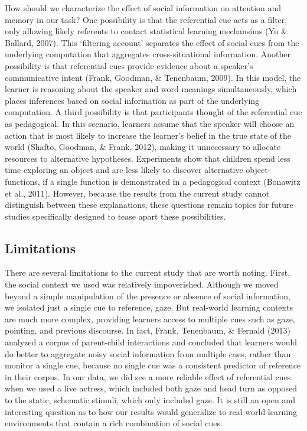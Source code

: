 \documentclass[authoryear, review]{elsarticle}
\begin{document}
How should we characterize the effect of social information on attention
and memory in our task? One possibility is that the referential cue acts
as a filter, only allowing likely referents to contact statistical
learning mechansims (Yu \& Ballard, 2007). This `filtering account'
separates the effect of social cues from the underlying computation that
aggregates cross-situational information. Another possibility is that
referential cues provide evidence about a speaker's communicative intent
(Frank, Goodman, \& Tenenbaum, 2009). In this model, the learner is
reasoning about the speaker and word meanings simultaneously, which
places inferences based on social information as part of the underlying
computation. A third possibility is that participants thought of the
referential cue as pedagogical. In this scenario, learners assume that
the speaker will choose an action that is most likely to increase the
learner's belief in the true state of the world (Shafto, Goodman, \&
Frank, 2012), making it unnecessary to allocate resources to alternative
hypotheses. Experiments show that children spend less time exploring an
object and are less likely to discover alternative object-functions, if
a single function is demonstrated in a pedagogical context (Bonawitz et
al., 2011). However, because the results from the current study cannot
distinguish between these explanations, these questions remain topics
for future studies specifically designed to tease apart these
possibilities.

\subsection{Limitations}\label{limitations}

There are several limitations to the current study that are worth
noting. First, the social context we used was relatively impoverished.
Although we moved beyond a simple manipulation of the presence or
absence of social information, we isolated just a single cue to
reference, gaze. But real-world learning contexts are much more complex,
providing learners access to multiple cues such as gaze, pointing, and
previous discourse. In fact, Frank, Tenenbaum, \& Fernald (2013)
analyzed a corpus of parent-child interactions and concluded that
learners would do better to aggregate noisy social information from
multiple cues, rather than monitor a single cue, because no single cue
was a consistent predictor of reference in their corpus. In our data, we
did see a more reliable effect of referential cues when we used a live
actress, which included both gaze and head turn as opposed to the
static, schematic stimuli, which only included gaze. It is still an open
and interesting question as to how our results would generalize to
real-world learning environments that contain a rich combination of
social cues.
\end{document}
